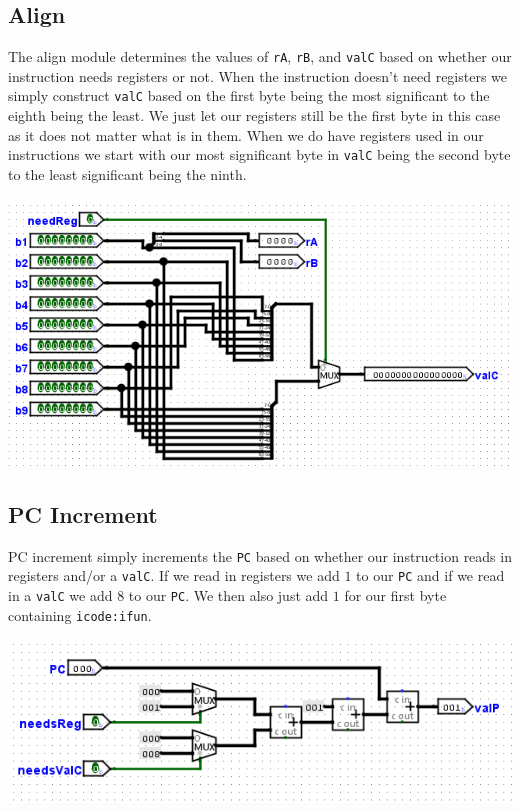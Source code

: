 \documentclass{article}
\begin{document}
\subsection{Align}
The align module determines the values of \verb+rA+, \verb+rB+, and \verb+valC+ based on whether our instruction needs registers or not. When the instruction doesn't need registers we simply construct  \verb+valC+ based on the first byte being the most significant to the eighth being the least. We just let our registers still be the first byte in this case as it does not matter what is in them. When we do have registers used in our instructions we start with our most significant byte in \verb+valC+ being the second byte to the least significant being the ninth.
\begin{center}
    \includegraphics[scale=.7]{align.png}
\end{center}
\subsection{PC Increment}
PC increment simply increments the \verb+PC+ based on whether our instruction reads in registers and/or a \verb+valC+. If we read in registers we add $1$ to our \verb+PC+ and if we read in a \verb+valC+ we add $8$ to our \verb+PC+. We then also just add $1$ for our first byte containing  \verb+icode:ifun+.
\begin{center}
    \includegraphics[scale=.5]{pcInc.png}
\end{center}
\end{document}
